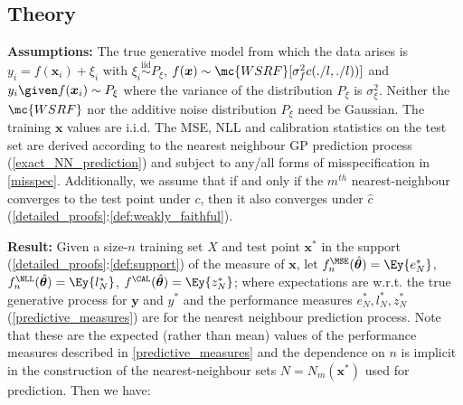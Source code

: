 \subsection{Theory}
\label{theory}
\textbf{Assumptions:} The true generative model from which the data arises is \(y_i=f(\bm{x}_i) + \xi_i\) with \(\xi_i\overset{\textrm{iid}}{\sim}P_\xi\), \(f(\bm{x})\sim \mc{WSRF}[\sigma_f^2 c(./l,./l))]\) and \(y_i\given f(\bm{x}_i) \sim P_\xi\) where the variance of the distribution $P_\xi$ is $\sigma_\xi^2$. Neither the $\mc{WSRF}$ nor the additive noise distribution $P_\xi$ need be Gaussian. The training $\bm{x}$ values are i.i.d. The MSE, NLL and calibration statistics on the test set are derived according to the nearest neighbour GP prediction process (\ref{exact_NN_prediction}) and subject to any/all forms of misspecification in \ref{misspec}. Additionally, we assume that if and only if the \(m^{th}\) nearest-neighbour converges to the test point under \(c\), then it also converges under \(\hat{c}\) (\ref{detailed_proofs}:\autoref{def:weakly_faithful}).



\textbf{Result:} Given a size-$n$ training set $X$ and test point $\bm{x}^*$ in the support (\ref{detailed_proofs}:\autoref{def:support}) of the measure of $\bm{x}$, let $f^{\MSE}_n(\hat{\bm{\theta}})= \Ey {e_N^*}$, $f^{\NLL}_n(\hat{\bm{\theta}})= \Ey {l_N^*}$, $f^{\CAL}(\hat{\bm{\theta}}) = \Ey{z_N^*}$; where expectations are w.r.t. the true generative process for $\bm{y}$ and $y^*$ and the performance measures $e_N^*,l_N^*,z_N^*$ (\autoref{predictive_measures}) are for the nearest neighbour prediction process.
Note that these are the expected (rather than mean) values of the performance measures described in \autoref{predictive_measures} and the dependence on \(n\) is implicit in the construction of the nearest-neighbour sets $N = N_m(\bm{x}^*)$ used for prediction. Then we have:

